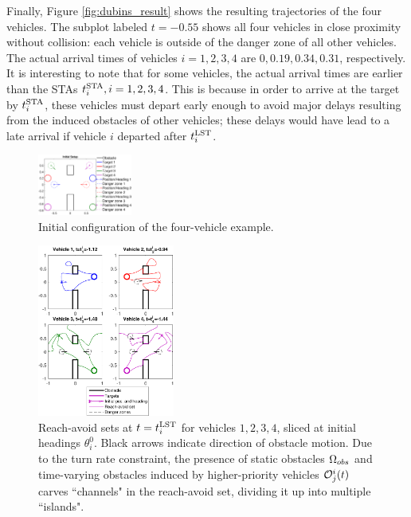 \documentclass[letterpaper, 10pt, conference]{ieeeconf}      %
\begin{document}
Finally, Figure \ref{fig:dubins_result} shows the resulting trajectories of the four vehicles. The subplot labeled $t=-0.55$ shows all four vehicles in close proximity without collision: each vehicle is outside of the danger zone of all other vehicles. The actual arrival times of vehicles $i=1,2,3,4$ are $0, 0.19, 0.34, 0.31$, respectively. It is interesting to note that for some vehicles, the actual arrival times are earlier than the STAs $t^{\text{STA}}_i, i=1,2,3,4$. This is because in order to arrive at the target by $t^{\text{STA}}_i$, these vehicles must depart early enough to avoid major delays  resulting from the induced obstacles of other vehicles; these delays would have lead to a late arrival if vehicle $i$ departed after $t^{\text{LST}}_i$.

\begin{figure}
	\centering
	\includegraphics[width=0.275\textwidth]{"dubins_ic"}
	\caption{Initial configuration of the four-vehicle example.}
	\label{fig:dubins_ic}
\end{figure}

\begin{figure}
	\centering
	\includegraphics[width=0.4\textwidth]{"dubins_reach_all"}
	\caption{Reach-avoid sets at $t=t^{\text{LST}}_i$ for vehicles $1,2,3,4$, sliced at initial headings $\theta_i^0$. Black arrows indicate direction of obstacle motion. Due to the turn rate constraint, the presence of static obstacles $\Omega_{obs}$ and time-varying obstacles induced by higher-priority vehicles $\mathcal{O}^i_j(t)$ carves ``channels" in the reach-avoid set, dividing it up into multiple ``islands".}
	\label{fig:dubins_reach_all}
\end{figure}
\end{document}
